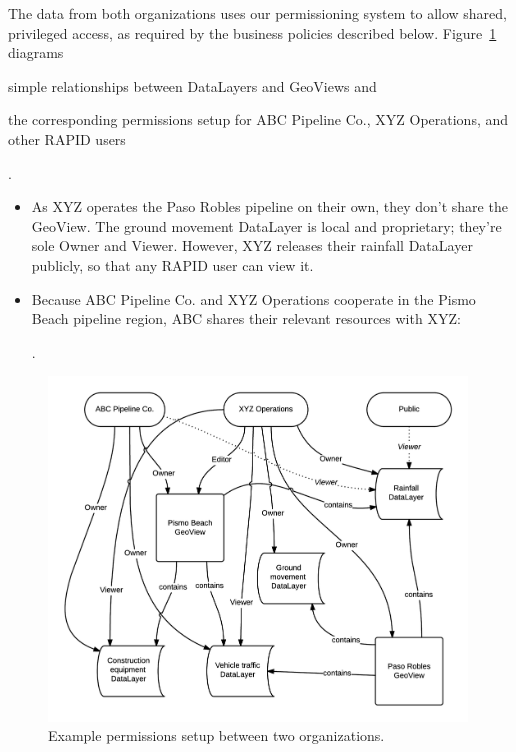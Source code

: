 The data from both organizations uses our permissioning system to allow shared, privileged access, as required by the business policies described below. Figure~\ref{fig:permissions} diagrams  
\begin{enumerate*}[label=\itshape\alph*\upshape)]
\item simple relationships between DataLayers and GeoViews and
\item the corresponding permissions setup for ABC Pipeline Co., XYZ Operations, and other RAPID users
\end{enumerate*}.

\begin{itemize}
\item As XYZ operates the Paso Robles pipeline on their own, they don't share the GeoView. The ground movement DataLayer is local and proprietary; they're sole Owner and Viewer. However, XYZ releases their rainfall DataLayer publicly, so that any RAPID user can view it.
\item Because ABC Pipeline Co. and XYZ Operations cooperate in the Pismo Beach pipeline region, ABC shares their relevant resources with XYZ: .
\end{itemize}
 

\begin{figure}[ht]
    \centering
    \includegraphics[width=0.99\textwidth]{figures/permissions.png}
    \caption{Example permissions setup between two organizations.}
    \label{fig:permissions}
\end{figure}

